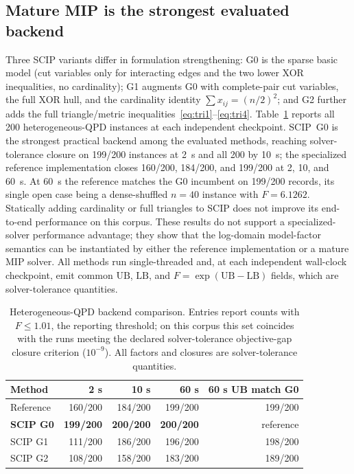 \documentclass[
  aps,
  pra,
  reprint,
  amsmath,
  amssymb,
  longbibliography,
  nofootinbib,
  floatfix
]{revtex4-2}
\theoremstyle{plain}
\newcommand{\LB}{\mathrm{LB}}
\newcommand{\UB}{\mathrm{UB}}
\newcommand{\tabfit}[1]{{\footnotesize #1}}
\begin{document}
\subsection{Mature MIP is the strongest evaluated backend}

Three SCIP variants differ in formulation strengthening: G0 is the sparse basic model (cut variables only for interacting edges and the two lower XOR inequalities, no cardinality); G1 augments G0 with complete-pair cut variables, the full XOR hull, and the cardinality identity $\sum x_{ij}=(n/2)^2$; and G2 further adds the full triangle/metric inequalities~\eqref{eq:tri1}--\eqref{eq:tri4}. Table~\ref{tab:e7-backends} reports all 200 heterogeneous-QPD instances at each independent checkpoint. SCIP~G0 is the strongest practical backend among the evaluated methods, reaching solver-tolerance closure on 199/200 instances at 2~s and all 200 by 10~s; the specialized reference implementation closes 160/200, 184/200, and 199/200 at 2, 10, and 60~s. At 60~s the reference matches the G0 incumbent on 199/200 records, its single open case being a dense-shuffled $n=40$ instance with $F=6.1262$. Statically adding cardinality or full triangles to SCIP does not improve its end-to-end performance on this corpus. These results do not support a specialized-solver performance advantage; they show that the log-domain model-factor semantics can be instantiated by either the reference implementation or a mature MIP solver. All methods run single-threaded and, at each independent wall-clock checkpoint, emit common $\UB$, $\LB$, and $F=\exp(\UB-\LB)$ fields, which are solver-tolerance quantities.

\begin{table}[tbp]
\centering
\caption{Heterogeneous-QPD backend comparison. Entries report counts with $F\leq1.01$, the reporting threshold; on this corpus this set coincides with the runs meeting the declared solver-tolerance objective-gap closure criterion ($10^{-9}$). All factors and closures are solver-tolerance quantities.}
\label{tab:e7-backends}
\tabfit{%
\begin{tabular*}{\columnwidth}{@{\extracolsep{\fill}}lrrrr@{}}
\toprule
\textbf{Method} & \textbf{2 s} & \textbf{10 s} & \textbf{60 s} & \textbf{60 s UB match G0}\\
\midrule
Reference & 160/200 & 184/200 & 199/200 & 199/200\\
\textbf{SCIP G0} & \textbf{199/200} & \textbf{200/200} & \textbf{200/200} & reference\\
SCIP G1 & 111/200 & 186/200 & 196/200 & 198/200\\
SCIP G2 & 108/200 & 158/200 & 183/200 & 189/200\\
\bottomrule
\end{tabular*}
}
\end{table}
\end{document}

